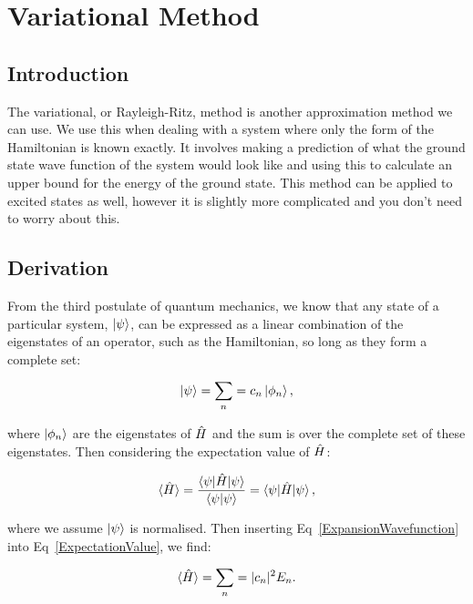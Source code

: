 \chapter{Variational Method}
\label{chapt3}

\section{Introduction}

The variational, or Rayleigh-Ritz, method is another approximation method we can use. We use this when dealing with a system where only the form of the Hamiltonian is known exactly. It involves making a prediction of what the ground state wave function of the system would look like and using this to calculate an upper bound for the energy of the ground state. This method can be applied to excited states as well, however it is slightly more complicated and you don't need to worry about this.

\section{Derivation}

From the third postulate of quantum mechanics, we know that any state of a particular system, $\ket{\psi}$, can be expressed as a linear combination of the eigenstates of an operator, such as the Hamiltonian, so long as they form a complete set:

\begin{equation}
    \ket{\psi} = \sum_n = c_n \ket{\phi_n},
    \label{ExpansionWavefunction}
\end{equation}

\noindent where $\ket{\phi_n}$ are the eigenstates of $\Hat{H}$ and the sum is over the complete set of these eigenstates. Then considering the expectation value of $\Hat{H}$:

\begin{equation}
    \braket{\Hat{H}} = \frac{\braket{\psi | \Hat{H} | \psi}}{\braket{\psi | \psi}} = \braket{\psi | \Hat{H} | \psi},
    \label{ExpectationValue}
\end{equation}

\noindent where we assume $\ket{\psi}$ is normalised. Then inserting Eq~\ref{ExpansionWavefunction} into Eq~\ref{ExpectationValue}, we find:

\begin{equation}
    \braket{\Hat{H}} = \sum_n = |c_n|^2 E_n.
    \label{ExpectationValueExpanded}
\end{equation}


